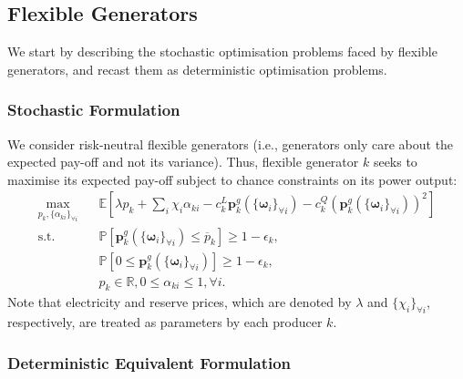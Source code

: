 \documentclass{article}
\begin{document}
\subsection{Flexible Generators}

We start by describing the stochastic optimisation problems faced by flexible generators, and recast them as deterministic optimisation problems.

\subsubsection{Stochastic Formulation}

We consider risk-neutral flexible generators (i.e., generators only care about the expected pay-off and not its variance). Thus, flexible generator $k$ seeks to maximise its expected pay-off subject to chance constraints on its power output:
\begin{align}
\underset{p_k, \{\alpha_{ki}\}_{\forall i}}{\max} \hspace{10pt} & \mathbb{E}[\lambda p_k + \sum_i \chi_i \alpha_{ki} - c_k^L \mathbf{p}_k^g(\{\boldsymbol{\omega}_i\}_{\forall i}) - c_k^Q (\mathbf{p}_k^g(\{\boldsymbol{\omega}_i\}_{\forall i}))^2]\\
\mbox{s.t. } & \mathbb{P}[\mathbf{p}_k^g(\{\boldsymbol{\omega}_i\}_{\forall i}) \le \overline{p}_k] \ge 1 - \epsilon_k,\\
& \mathbb{P}[0 \le \mathbf{p}_k^g(\{\boldsymbol{\omega}_i\}_{\forall i})] \ge 1 - \epsilon_k,\\
&p_k \in \mathbb{R}, 0 \le \alpha_{ki} \le 1, \forall i.
\end{align}
Note that electricity and reserve prices, which are denoted by $\lambda$ and $\{\chi_i\}_{\forall i}$, respectively, are treated as parameters by each producer $k$.
\subsubsection{Deterministic Equivalent Formulation}
\end{document}
